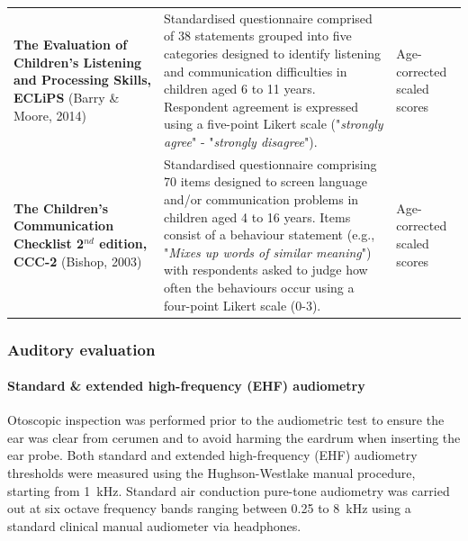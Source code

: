\documentclass[a4paper, twoside]{templates/ociamthesis}
\begin{document}
\begin{table}
{\begin{tabular}[t]{>{\raggedright\arraybackslash}p{12em}>{\raggedright\arraybackslash}p{24em}>{\raggedright\arraybackslash}p{10em}}
\addlinespace
\textbf{The Evaluation of Children's Listening and Processing Skills, ECLiPS} (Barry \& Moore, 2014) & Standardised questionnaire comprised of 38  statements grouped into five categories designed to identify listening and communication difficulties in children aged 6 to 11 years. Respondent agreement is expressed using a five-point Likert scale ("\textit{strongly agree}" - "\textit{strongly disagree}"). & Age-corrected scaled scores\\
\addlinespace
\textbf{The Children's Communication Checklist 2$^{nd}$ edition, CCC-2} (Bishop, 2003) & Standardised questionnaire comprising 70 items designed to screen language and/or communication problems in children aged 4 to 16 years. Items consist of a behaviour statement (e.g., "\textit{Mixes up words of similar meaning}") with respondents asked to judge how often the behaviours occur using a four-point Likert scale (0-3). & Age-corrected scaled scores\\
\bottomrule
\end{tabular}}
\end{table}

\hypertarget{auditory-evaluation}{%
\subsubsection{Auditory evaluation}\label{auditory-evaluation}}

\hypertarget{standard-extended-high-frequency-ehf-audiometry}{%
\paragraph*{Standard \& extended high-frequency (EHF) audiometry}\label{standard-extended-high-frequency-ehf-audiometry}}

\hfill\break
Otoscopic inspection was performed prior to the audiometric test to ensure the ear was clear from cerumen and to avoid harming the eardrum when inserting the ear probe. Both standard and extended high-frequency (EHF) audiometry thresholds were measured using the Hughson-Westlake manual procedure, starting from 1~kHz. Standard air conduction pure-tone audiometry was carried out at six octave frequency bands ranging between 0.25 to 8~kHz using a standard clinical manual audiometer via headphones.\\
\end{document}
